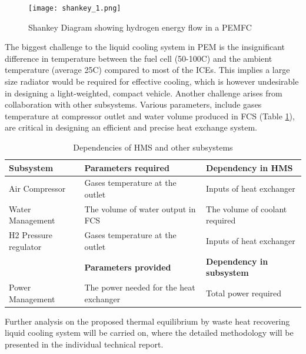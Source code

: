 \documentclass[a4paper,11pt]{article}
\begin{document}
\begin{figure}[h]
    \texttt{[image: shankey\_1.png]}
    \centering  
    \caption{Shankey Diagram showing hydrogen energy flow in a PEMFC\cite{nguyen2020proton}}
    \centering
    \label{fig:sangkyEnergy}  
\end{figure}

The biggest challenge to the liquid cooling system in PEM is the insignificant difference in temperature between the fuel cell (50-100\degree C) and the ambient temperature (average 25\degree C) compared to most of the ICEs\cite{islamnanofluid}. This implies a large size radiator would be required for effective cooling, which is however undesirable in designing a light-weighted, compact vehicle. Another challenge arises from collaboration with other subsystems. Various parameters, include gases temperature at compressor outlet and water volume produced in FCS (Table \ref{tab:subsystemDependencies}), are critical in designing an efficient and precise heat exchange system.

\begin{table}[h!]
    \centering
    \begin{tabular}{|l|l|l|}%
    \hline
    \textbf{Subsystem} & \textbf{Parameters required} & \textbf{Dependency in HMS} \\ [0.5ex] 
    \hline\hline
    Air Compressor & Gases temperature at the outlet & Inputs of heat exchanger \\
    \hline
    Water Management & The volume of water output in FCS & The volume of coolant required \\
    \hline
    H2 Pressure regulator & Gases temperature at the outlet & Inputs of heat exchanger \\
    \hline
    & \textbf{Parameters provided} & \textbf{Dependency in subsystem} \\
    \hline
    Power Management & The power needed for the heat exchanger & Total power required \\
    \hline
    \end{tabular}
    \caption{Dependencies of HMS and other subsystems}
    \label{tab:subsystemDependencies}
\end{table}

Further analysis on the proposed thermal equilibrium by waste heat recovering liquid cooling system will be carried on, where the detailed methodology will be presented in the individual technical report.
\end{document}
